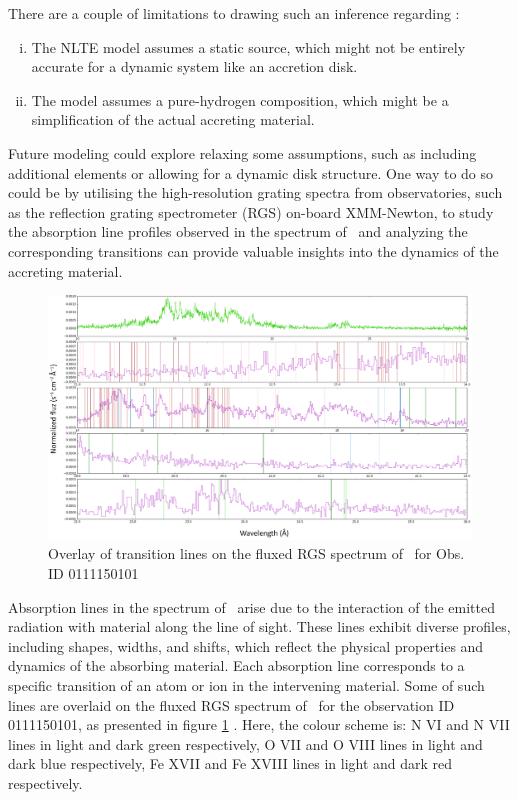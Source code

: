     		There are a couple of limitations to drawing such an inference regarding \source:
		    \begin{enumerate}[i.]
		    	\item The NLTE model assumes a static source, which might not be entirely accurate for a dynamic system like an accretion disk.
		    	\item The model assumes a pure-hydrogen composition, which might be a simplification of the actual accreting material.
		    \end{enumerate}
		    
		    Future modeling could explore relaxing some assumptions, such as including additional elements or allowing for a dynamic disk structure. One way to do so could be by utilising the high-resolution grating spectra from observatories, such as the reflection grating spectrometer (RGS) on-board XMM-Newton, to study the absorption line profiles observed in the spectrum of \source\ and analyzing the corresponding transitions can provide valuable insights into the dynamics of the accreting material.
		    
		    \begin{figure}[!htb]
		    	\centering
		    	\includegraphics[width=\textwidth]{images/fig-line_identification-rgs.png}
		    	\caption{Overlay of transition lines on the fluxed RGS spectrum of \source\ for Obs. ID 0111150101}
		    	\label{fig:rgs-line-overlay}  
		    \end{figure}
		    
		    Absorption lines in the spectrum of \source\ arise due to the interaction of the emitted radiation with material along the line of sight. These lines exhibit diverse profiles, including shapes, widths, and shifts, which reflect the physical properties and dynamics of the absorbing material. Each absorption line corresponds to a specific transition of an atom or ion in the intervening material. Some of such lines are overlaid on the fluxed RGS spectrum of \source\ for the observation ID 0111150101, as presented in figure \ref{fig:rgs-line-overlay} \cite{bhattacharya2020python}. Here, the colour scheme is: N VI and N VII lines in light and dark green respectively, O VII and O VIII lines in light and dark blue respectively, Fe XVII and Fe XVIII lines in light and dark red respectively.
		    
